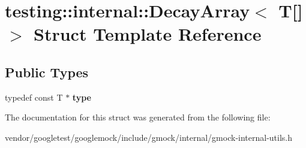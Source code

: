 \hypertarget{structtesting_1_1internal_1_1_decay_array_3_01_t[]_4}{}\section{testing\+:\+:internal\+:\+:Decay\+Array$<$ T\mbox{[}\mbox{]}$>$ Struct Template Reference}
\label{structtesting_1_1internal_1_1_decay_array_3_01_t[]_4}
\subsection*{Public Types}
\begin{DoxyCompactItemize}
\item 
\mbox{\label{structtesting_1_1internal_1_1_decay_array_3_01_t[]_4_a1820b673d104b3a985faaef8db5d77d2}} 
typedef const T $\ast$ {\bfseries type}
\end{DoxyCompactItemize}


The documentation for this struct was generated from the following file\+:\begin{DoxyCompactItemize}
\item 
vendor/googletest/googlemock/include/gmock/internal/gmock-\/internal-\/utils.\+h\end{DoxyCompactItemize}

